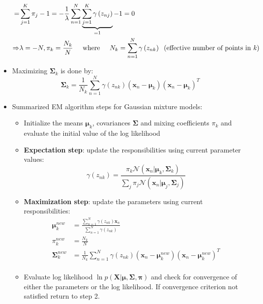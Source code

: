 \begin{itemize}
\begin{equation*}
\begin{split}
			= & \sum\limits_{j=1}^{K}\pi_j - 1 = -\frac{1}{\lambda}\sum\limits_{n=1}^{N} \underbrace{\sum\limits_{j=1}^{K}\gamma\left(z_{nj}\right)}_{=1} - 1 = 0\\
			\Rightarrow & \lambda = -N, \pi_k = \frac{N_k}{N} \text{\hspace{5mm}where\hspace{5mm}} N_k = \sum\limits_{n=1}^{N} \gamma\left(z_{nk}\right) \text{\hspace{2mm}(effective number of points in \textit{k})}
		\end{split}
	\end{equation*}
	\item Maximizing $\bm{\Sigma}_k$ is done by:
	$$\bm{\Sigma}_k = \frac{1}{N_k} \sum\limits_{n=1}^{N} \gamma\left(z_{nk}\right)\left(\bm{x}_n - \bm{\mu}_k\right)\left(\bm{x}_n - \bm{\mu}_k\right)^T$$
	\item Summarized EM algorithm steps for Gaussian mixture models: 
	\begin{itemize}
	    \item Initialize the means $\bm{\mu}_k$, covariances $\bm{\Sigma}$ and mixing coefficients $\pi_k$ and evaluate the initial value of the log likelihood
		\item \textbf{Expectation step}: update the responsibilities using current parameter values:
		$$\gamma\left(z_{nk}\right) = \frac{\pi_k \mathcal{N}\left(\bm{x}_n|\bm{\mu}_k, \bm{\Sigma}_k\right)}{\sum_j \pi_j \mathcal{N}\left(\bm{x}_n|\bm{\mu}_j, \bm{\Sigma}_j\right)}$$
		\item \textbf{Maximization step}: update the parameters using current responsibilities:
		\begin{equation*}
			\begin{split}
				\bm{\mu}_k^{new} & = \frac{\sum_{n=1}^{N}\gamma\left(z_{nk}\right)\bm{x}_n}{\sum_{n=1}^{N}\gamma\left(z_{nk}\right)}\\
				\pi_k^{new} & = \frac{N_k}{N}\\
				\bm{\Sigma}_k^{new} & = \frac{1}{N_k} \sum\limits_{n=1}^{N} \gamma\left(z_{nk}\right)\left(\bm{x}_n - \bm{\mu}_k^{new}\right)\left(\bm{x}_n - \bm{\mu}_k^{new}\right)^T\\
			\end{split}
		\end{equation*}
		\item Evaluate log likelihood $\ln p(\bm{X}|\bm{\mu},\bm{\Sigma}, \bm{\pi})$ and check for convergence of either the parameters or the log likelihood. If convergence criterion not satisfied return to step 2.

\end{itemize}
\end{itemize}
